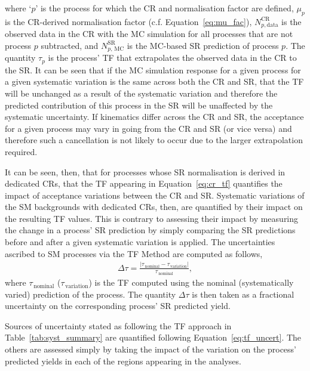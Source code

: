 where `$p$' is the process for which the CR and normalisation factor are defined, $\mu_p$
is the CR-derived normalisation factor (c.f. Equation~\ref{eq:mu_fac}),
$N_{p, \text{data}}^{\text{CR}}$ is the observed data in the CR with the MC simulation
for all processes that are not process $p$ subtracted, and $N_{p,\,\text{MC}}^{\text{SR}}$
is the MC-based SR prediction of process $p$.
The quantity $\tau_p$ is the process' TF that extrapolates the observed data in the CR
to the SR.
It can be seen that if the MC simulation response for a given process for a given systematic variation is the same
across both the CR and SR, that the TF will be unchanged as a result of the systematic
variation and therefore the predicted contribution of this process in the SR will
be unaffected by the systematic uncertainty.
If kinematics differ across the CR and SR, the acceptance for a given process may vary
in going from the CR and SR (or vice versa) and therefore such a cancellation is not likely to
occur due to the larger extrapolation required.

It can be seen, then, that for processes whose SR normalisation is derived in dedicated CRs,
that the TF appearing in Equation~\ref{eq:cr_tf} quantifies the impact of acceptance
variations between the CR and SR.
Systematic variations of the SM backgrounds with dedicated CRs, then, are quantified
by their impact on the resulting TF values.
This is contrary to assessing their impact by measuring the change in a process' SR prediction
by simply comparing the SR predictions before and after a given systematic variation is applied.
The uncertainties ascribed to SM processes via the TF Method are computed as follows,
\begin{align}
    \Delta \tau = \frac{ \lvert \tau_{\,\text{nominal}} - \tau_{\,\text{variation}} \rvert} { \tau_{\,\text{nominal}} },
    \label{eq:tf_uncert}
\end{align}
where $\tau_{\,\text{nominal}}$ ($\tau_{\,\text{variation}}$) is the TF computed
using the nominal (systematically varied) prediction of the process.
The quantity $\Delta \tau$ is then taken as a fractional uncertainty on the corresponding
process' SR predicted yield.

Sources of uncertainty stated as following the TF approach in Table~\ref{tab:syst_summary} are
quantified following Equation~\ref{eq:tf_uncert}.
The others are assessed simply by taking the impact of the variation on the process'
predicted yields in each of the regions appearing in the analyses.

